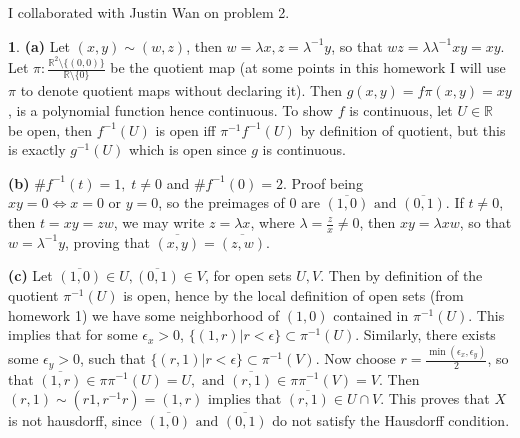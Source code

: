 \documentclass[10.5pt]{article}
\theoremstyle{definition}
\newtheorem{pb}{}
\newcommand{\set}[1]{\{#1\}}
\newcommand{\tand}{\text{ and }}
\newcommand{\tor}{\text{ or }}
\begin{document}
    I collaborated with Justin Wan on problem 2.

    \begin{pb}
        \textbf{(a)} Let \((x,y) \sim (w,z)\), then \(w = \lambda x, z = \lambda^{-1} y\), so that \(wz = \lambda \lambda^{-1}xy = xy\).
        Let \(\pi: \frac{\mathbb{R}^2 \setminus \set{(0,0)}}{\mathbb{R}\setminus \set{0}}\) be the quotient map 
        (at some points in this homework I will use \(\pi\) to denote quotient maps without declaring it). Then \(g(x,y) = f\pi(x,y) = xy\), is a polynomial function hence continuous.
        To show \(f\) is continuous, let \(U \in \mathbb{R}\) be open, then \(f^{-1}(U)\) is open iff \(\pi^{-1}f^{-1}(U)\) by definition of quotient, but this is exactly \(g^{-1}(U)\)
        which is open since \(g \) is continuous.

        \textbf{(b)} \(\# f^{-1}(t) = 1, \; t \neq 0\) and \(\# f^{-1}(0) = 2\). Proof being \(xy = 0 \iff x = 0 \tor y = 0\), so the preimages of \(0\) are \(\overline{(1,0)} \tand \overline{(0,1)}\).
        If \(t \neq 0\), then \(t = xy = zw\), we may write \(z = \lambda x\), where \(\lambda = \frac{z }{x } \neq 0 \), then \(xy = \lambda x w\), so that \(w = \lambda^{-1}y\), proving that
        \(\overline{(x,y)} = \overline{(z,w )}\).

        \textbf{(c)} Let \(\overline{(1,0)} \in U, \overline{(0,1)} \in V\), for open sets \(U, V \). Then by definition of the quotient \(\pi^{-1}(U)\) is open, hence by the local definition of open sets (from homework 1)
        we have some neighborhood of \((1,0)\) contained in \(\pi^{-1}(U)\). This implies that for some \(\epsilon_x > 0\), \(\set{(1,r ) \vert r < \epsilon} \subset \pi^{-1}(U)\). Similarly, there exists some
        \(\epsilon_y > 0\), such that \(\set{(r,1) \vert r < \epsilon} \subset \pi^{-1}(V)\). Now choose \(r = \frac{\min{(\epsilon_x,\epsilon_y )}}{2}\), so that
        \(\overline{(1,r)} \in \pi\pi^{-1}(U) = U, \tand \overline{(r,1)} \in \pi\pi^{-1}(V) = V\). Then \((r,1) \sim (r1, r^{-1}r) = (1,r)\) implies that \(\overline{(r,1)} \in U \cap V \). This proves that
        \(X \) is not hausdorff, since \(\overline{(1,0)} \tand \overline{(0,1)}\) do not satisfy the Hausdorff condition.


\end{pb}
\end{document}

